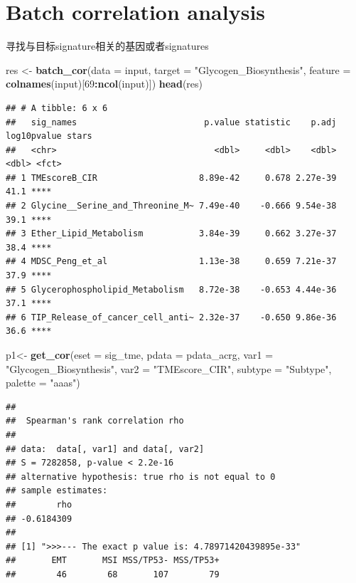 \documentclass[
  12pt,
]{book}
\newenvironment{Shaded}{\begin{snugshade}}{\end{snugshade}}
\newcommand{\AttributeTok}[1]{\textcolor[rgb]{0.13,0.29,0.53}{#1}}
\newcommand{\DecValTok}[1]{\textcolor[rgb]{0.00,0.00,0.81}{#1}}
\newcommand{\FunctionTok}[1]{\textcolor[rgb]{0.13,0.29,0.53}{\textbf{#1}}}
\newcommand{\NormalTok}[1]{#1}
\newcommand{\OtherTok}[1]{\textcolor[rgb]{0.56,0.35,0.01}{#1}}
\newcommand{\SpecialCharTok}[1]{\textcolor[rgb]{0.81,0.36,0.00}{\textbf{#1}}}
\newcommand{\StringTok}[1]{\textcolor[rgb]{0.31,0.60,0.02}{#1}}
\theoremstyle{definition}
\theoremstyle{definition}
\theoremstyle{definition}
\theoremstyle{definition}
\theoremstyle{remark}
\begin{document}
\hypertarget{batch-correlation-analysis}{%
\section{Batch correlation analysis}\label{batch-correlation-analysis}}

寻找与目标signature相关的基因或者signatures

\begin{Shaded}
\begin{Highlighting}[]
\NormalTok{res }\OtherTok{\textless{}{-}} \FunctionTok{batch\_cor}\NormalTok{(}\AttributeTok{data =}\NormalTok{ input, }\AttributeTok{target =} \StringTok{"Glycogen\_Biosynthesis"}\NormalTok{, }\AttributeTok{feature =} \FunctionTok{colnames}\NormalTok{(input)[}\DecValTok{69}\SpecialCharTok{:}\FunctionTok{ncol}\NormalTok{(input)])}
\FunctionTok{head}\NormalTok{(res)}
\end{Highlighting}
\end{Shaded}

\begin{verbatim}
## # A tibble: 6 x 6
##   sig_names                         p.value statistic    p.adj log10pvalue stars
##   <chr>                               <dbl>     <dbl>    <dbl>       <dbl> <fct>
## 1 TMEscoreB_CIR                    8.89e-42     0.678 2.27e-39        41.1 **** 
## 2 Glycine__Serine_and_Threonine_M~ 7.49e-40    -0.666 9.54e-38        39.1 **** 
## 3 Ether_Lipid_Metabolism           3.84e-39     0.662 3.27e-37        38.4 **** 
## 4 MDSC_Peng_et_al                  1.13e-38     0.659 7.21e-37        37.9 **** 
## 5 Glycerophospholipid_Metabolism   8.72e-38    -0.653 4.44e-36        37.1 **** 
## 6 TIP_Release_of_cancer_cell_anti~ 2.32e-37    -0.650 9.86e-36        36.6 ****
\end{verbatim}

\begin{Shaded}
\begin{Highlighting}[]
\NormalTok{p1}\OtherTok{\textless{}{-}} \FunctionTok{get\_cor}\NormalTok{(}\AttributeTok{eset =}\NormalTok{ sig\_tme, }\AttributeTok{pdata =}\NormalTok{ pdata\_acrg, }\AttributeTok{var1 =} \StringTok{"Glycogen\_Biosynthesis"}\NormalTok{, }\AttributeTok{var2 =} \StringTok{"TMEscore\_CIR"}\NormalTok{, }\AttributeTok{subtype =} \StringTok{"Subtype"}\NormalTok{, }\AttributeTok{palette =} \StringTok{"aaas"}\NormalTok{)}
\end{Highlighting}
\end{Shaded}

\begin{verbatim}
## 
##  Spearman's rank correlation rho
## 
## data:  data[, var1] and data[, var2]
## S = 7282858, p-value < 2.2e-16
## alternative hypothesis: true rho is not equal to 0
## sample estimates:
##        rho 
## -0.6184309 
## 
## [1] ">>>--- The exact p value is: 4.78971420439895e-33"
##       EMT       MSI MSS/TP53- MSS/TP53+ 
##        46        68       107        79
\end{verbatim}
\end{document}
